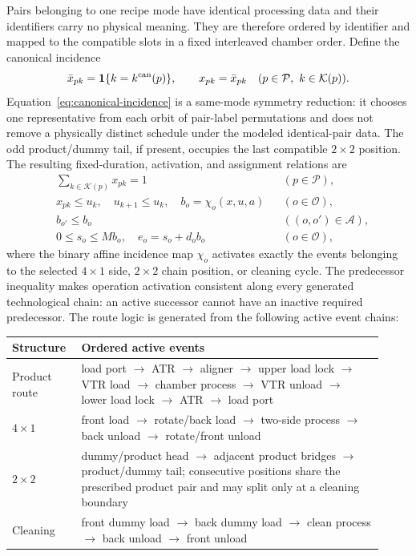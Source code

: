 \documentclass[11pt]{article}
\begin{document}
Pairs belonging to one recipe mode have identical processing data and their
identifiers carry no physical meaning. They are therefore ordered by identifier
and mapped to the compatible slots in a fixed interleaved chamber order. Define
the canonical incidence
\begin{equation}
\bar{x}_{pk}=\mathbf 1\{k=k^{\rm can}(p)\},\qquad
x_{pk}=\bar{x}_{pk}\quad(p\in\mathcal P,\ k\in\mathcal K(p)).
\label{eq:canonical-incidence}
\end{equation}
Equation~\ref{eq:canonical-incidence} is a same-mode symmetry reduction: it
chooses one representative from
each orbit of pair-label permutations and does not remove a physically distinct
schedule under the modeled identical-pair data. The odd product/dummy tail, if
present, occupies the last compatible $2\times2$ position. The resulting
fixed-duration, activation, and assignment relations are
\begin{align}
&\sum_{k\in\mathcal K(p)}x_{pk}=1 &&(p\in\mathcal P),\\
&x_{pk}\le u_k,\quad u_{k+1}\le u_k,\quad
b_o=\chi_o(x,u,a) &&(o\in\mathcal O),\\
&b_{o'}\le b_o &&((o,o')\in\mathcal A),\\
&0\le s_o\le Mb_o,\quad e_o=s_o+d_ob_o &&(o\in\mathcal O),
\end{align}
where the binary affine incidence map $\chi_o$ activates exactly the events
belonging to the selected $4\times1$ side, $2\times2$ chain position, or
cleaning cycle. The predecessor inequality makes operation activation
consistent along every generated technological chain: an active successor
cannot have an inactive required predecessor. The route logic is generated
from the following active event chains:
\begin{center}
\begin{tabular}{p{0.16\linewidth}p{0.76\linewidth}}
\toprule
Structure & Ordered active events \\
\midrule
Product route & load port $\rightarrow$ ATR $\rightarrow$ aligner
$\rightarrow$ upper load lock $\rightarrow$ VTR load $\rightarrow$ chamber
process $\rightarrow$ VTR unload $\rightarrow$ lower load lock
$\rightarrow$ ATR $\rightarrow$ load port \\
$4\times1$ & front load $\rightarrow$ rotate/back load $\rightarrow$
two-side process $\rightarrow$ back unload $\rightarrow$ rotate/front unload \\
$2\times2$ & dummy/product head $\rightarrow$ adjacent product bridges
$\rightarrow$ product/dummy tail; consecutive positions share the prescribed
product pair and may split only at a cleaning boundary \\
Cleaning & front dummy load $\rightarrow$ back dummy load $\rightarrow$
clean process $\rightarrow$ back unload $\rightarrow$ front unload \\
\bottomrule
\end{tabular}
\end{center}
\end{document}
